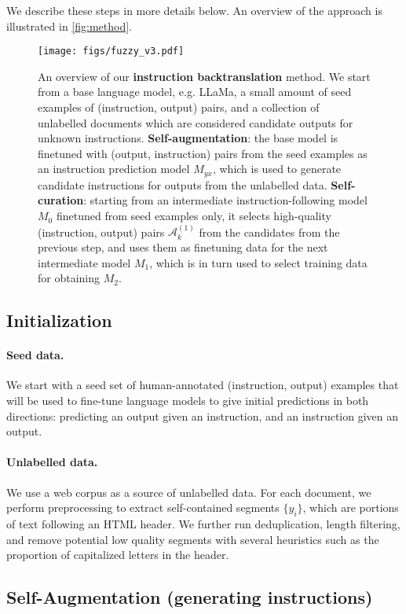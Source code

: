 We describe these steps in more details below. An overview of the approach is illustrated in \autoref{fig:method}.
\begin{figure}
  \centering
  \texttt{[image: figs/fuzzy\_v3.pdf]}
  \caption{An overview of our {\bf instruction backtranslation} method. We start from a base language model, e.g. LLaMa, a small amount of seed examples of (instruction, output) pairs, and a collection of unlabelled documents which are considered candidate outputs for unknown instructions. \textbf{Self-augmentation}: the base model is finetuned with (output, instruction) pairs from the seed examples as an instruction prediction model
  $M_{yx}$, which is used to generate candidate instructions for outputs from the unlabelled data. \textbf{Self-curation}: starting from an intermediate instruction-following model $M_0$ finetuned from seed examples only, it selects high-quality (instruction, output) pairs $\mathcal{A}_k^{(1)}$ from the candidates from the previous step, and uses them as finetuning data for the next intermediate model $M_1$, which is in turn used to select training data for obtaining $M_2$. }
  \label{fig:method}
\end{figure}
\vspace{-3mm}

\subsection{Initialization}
\paragraph{Seed data.} We start with a seed set of human-annotated (instruction, output) examples that will be used to fine-tune language models to give initial predictions in both directions: predicting an output given an instruction, and an instruction given an output. 

\paragraph{Unlabelled data.} We use a web corpus as a source of unlabelled data.
For each document, we perform preprocessing to extract self-contained segments $\{ y_{i}\}$, which are portions of text following an HTML header. We further run deduplication, length filtering, and remove potential low quality segments with several heuristics such as the proportion of capitalized letters in the header. 

\subsection{Self-Augmentation (generating instructions)}  \label{sec:self-augment}

